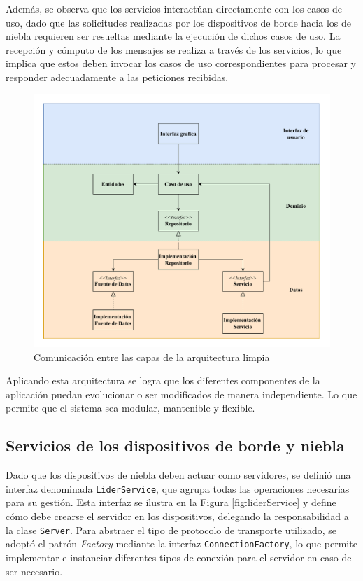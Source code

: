 Además, se observa que los servicios interactúan directamente con los casos de uso, dado que las solicitudes realizadas por los dispositivos de borde hacia los de niebla requieren ser resueltas mediante la ejecución de dichos casos de uso. La recepción y cómputo de los mensajes se realiza a través de los servicios, lo que implica que estos deben invocar los casos de uso correspondientes para procesar y responder adecuadamente a las peticiones recibidas.
\begin{figure}
    \centering
    \includegraphics[width=1\linewidth]{Imagenes/Implementacion/ComunicacionCapas.pdf}
    \caption{Comunicación entre las capas de la arquitectura limpia}
    \label{fig:comunCapasArquitectura}
\end{figure}

Aplicando esta arquitectura se logra que los diferentes componentes de la aplicación puedan evolucionar o ser modificados de manera independiente. Lo que permite que el sistema sea modular, mantenible y flexible.

\subsection{Servicios de los dispositivos de borde y niebla}
Dado que los dispositivos de niebla deben actuar como servidores, se definió una interfaz denominada \texttt{LiderService}, que agrupa todas las operaciones necesarias para su gestión. Esta interfaz se ilustra en la Figura \ref{fig:liderService} y define cómo debe crearse el servidor en los dispositivos, delegando la responsabilidad a la clase \texttt{Server}. Para abstraer el tipo de protocolo de transporte utilizado, se adoptó el patrón \textit{Factory} mediante la interfaz \texttt{ConnectionFactory}, lo que permite implementar e instanciar diferentes tipos de conexión para el servidor en caso de ser necesario.


